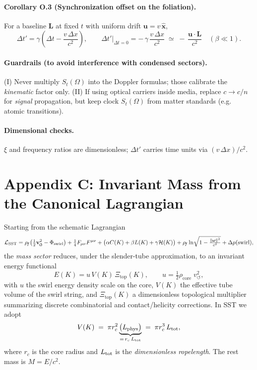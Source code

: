 \documentclass[11pt]{article}
\begin{document}
		\paragraph{Corollary O.3 (Synchronization offset on the foliation).}
		For a baseline $\mathbf L$ at fixed $t$ with uniform drift $\mathbf u = v\,\hat{\mathbf x}$,
		\[
			\Delta t'=\gamma\!\left(\Delta t-\frac{v\,\Delta x}{c^2}\right),
			\qquad
			\Delta t'\big|_{\Delta t=0}=-\,\gamma\,\frac{v\,\Delta x}{c^2}
			\;\simeq\; -\,\frac{\mathbf u\!\cdot\!\mathbf L}{c^2}\quad (\beta\ll 1).
		\]

		\paragraph{Guardrails (to avoid interference with condensed sectors).}
		(I) Never multiply $S_t(\Omega)$ into the Doppler formulas; those calibrate the \emph{kinematic} factor only.
		(II) If using optical carriers inside media, replace $c\!\to\! c/n$ for \emph{signal} propagation, but keep clock $S_t(\Omega)$ from matter standards (e.g. atomic transitions).

		\paragraph{Dimensional checks.}
		$\xi$ and frequency ratios are dimensionless; $\Delta t'$ carries time units via $(v\,\Delta x)/c^2$.




\section*{Appendix C: Invariant Mass from the Canonical Lagrangian}

        Starting from the schematic Lagrangian
        \[
            \mathcal{L}_{\text{SST}}
            = \rhof\!\left(\tfrac{1}{2}\vswirl^2 - \Phi_{\text{swirl}}\right)
            + \tfrac{1}{4}F_{\mu\nu}F^{\mu\nu}
            + \big(\alpha C(K)+\beta L(K)+\gamma \mathcal{H}(K)\big)
            + \rhof \ln\!\sqrt{1-\tfrac{\|\boldsymbol\omega\|^2}{c^2}}
            + \Delta p(\text{swirl}),
        \]
        the \emph{mass sector} reduces, under the slender-tube approximation, to an invariant energy functional
        \[
            E(K)= u\,V(K)\,\Xi_{\text{top}}(K),\qquad
            u=\tfrac{1}{2}\rho_{\text{core}}\;v_{\circlearrowleft}^{2},
        \]
        with $u$ the swirl energy density scale on the core, $V(K)$ the effective tube volume of the swirl string, and $\Xi_{\text{top}}(K)$ a dimensionless topological multiplier summarizing discrete combinatorial and contact/helicity corrections. In SST we adopt
        \[
            V(K)\;=\;\pi r_c^2 \underbrace{\big(L_{\rm phys}\big)}_{=\,r_c\,L_{\rm tot}}
            \;=\;\pi r_c^3\,L_{\rm tot},
        \]
        where $r_c$ is the core radius and $L_{\rm tot}$ is the \emph{dimensionless ropelength}. The rest mass is $M=E/c^2$.
\end{document}
